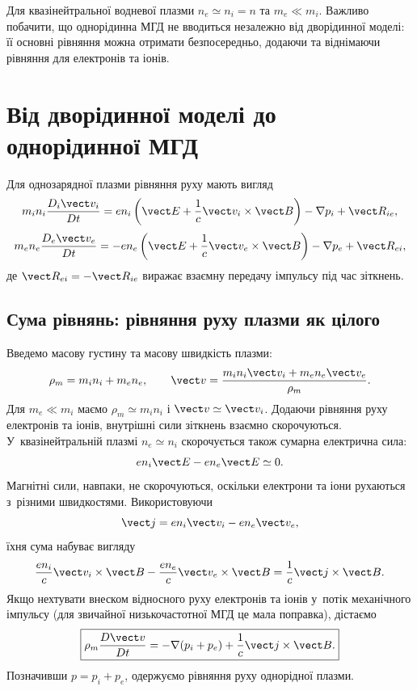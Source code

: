 Для квазінейтральної водневої плазми $n_e\simeq n_i=n$ та $m_e\ll m_i$. Важливо побачити,
що однорідинна МГД не вводиться незалежно від дворідинної моделі: її основні рівняння
можна отримати безпосередньо, додаючи та віднімаючи рівняння для електронів та іонів.



\section{Від дворідинної моделі до однорідинної МГД}



Для однозарядної плазми рівняння руху мають вигляд
\begin{equation*}
m_i n_i\frac{D_i\vect v_i}{Dt}
=
en_i\left(\vect E+\frac1c\vect v_i\times\vect B\right)
-\nabla p_i+\vect R_{ie},
\end{equation*}
\begin{equation*}
m_e n_e\frac{D_e\vect v_e}{Dt}
=-en_e\left(\vect E+\frac1c\vect v_e\times\vect B\right)
-\nabla p_e+\vect R_{ei},
\end{equation*}
де $\vect R_{ei}=-\vect R_{ie}$ виражає взаємну передачу імпульсу під час зіткнень.



\subsection{Сума рівнянь: рівняння руху плазми як цілого}



Введемо масову густину та масову швидкість плазми:
\begin{equation*}
\rho_m=m_i n_i+m_e n_e,
\qquad
\vect v=
\frac{m_i n_i\vect v_i+m_e n_e\vect v_e}{\rho_m}.
\end{equation*}
Для $m_e\ll m_i$ маємо $\rho_m\simeq m_i n_i$ і $\vect v\simeq\vect v_i$. Додаючи рівняння
руху електронів та іонів, внутрішні сили зіткнень взаємно скорочуються. У~квазінейтральній
плазмі $ n_e\simeq n_i$ скорочується також сумарна електрична сила:
\begin{equation*}
en_i\vect E-en_e\vect E\simeq0.
\end{equation*}
Магнітні сили, навпаки, не скорочуються, оскільки електрони та іони рухаються з~різними
швидкостями. Використовуючи
\begin{equation*}
\vect j=e n_i\vect v_i-e n_e\vect v_e,
\end{equation*}
їхня сума набуває вигляду
\begin{equation*}
\frac{e n_i}{c}\vect v_i\times\vect B
-
\frac{e n_e}{c}\vect v_e\times\vect B
=
\frac1c\vect j\times\vect B.
\end{equation*}
Якщо нехтувати внеском відносного руху електронів та іонів у~потік механічного імпульсу
(для звичайної низькочастотної МГД це мала поправка), дістаємо
\begin{equation}\label{eq:one-fluid-momentum-from-two-fluid}
\boxed{
\rho_m\frac{D\vect v}{Dt}
=
-\nabla(p_i+p_e)
+
\frac1c\vect j\times\vect B.
}
\end{equation}
Позначивши $p=p_i+p_e$, одержуємо рівняння руху однорідної плазми.

